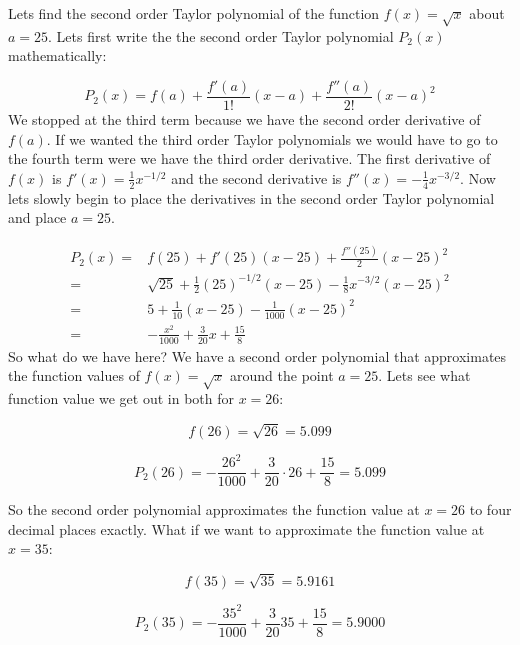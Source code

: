 \documentclass[main.tex]{subfiles}
\begin{document}
\begin{example}
Lets find the second order Taylor polynomial of the function $f(x) = \sqrt{x}$ about $a=25$. Lets first write the the second order Taylor polynomial $P_2(x)$ mathematically:

\begin{equation}
P_2(x) = f(a) + \frac{f'(a)}{1!}(x-a) + \frac{f''(a)}{2!}(x-a)^2
\end{equation}
We stopped at the third term because we have the second order derivative of $f(a)$. If we wanted the third order Taylor polynomials we would have to go to the fourth term were we have the third order derivative. The first derivative of $f(x)$ is $f'(x)=\frac{1}{2}x^{-1/2}$ and the second derivative is $f''(x) = -\frac{1}{4}x^{-3/2}$. Now lets slowly begin to place the derivatives in the second order Taylor polynomial and place $a=25$.

\begin{align}
P_2(x) =& f(25) +f'(25)(x-25) + \frac{f''(25)}{2}(x-25)^2\\
=& \sqrt{25} + \frac{1}{2}(25)^{-1/2}(x-25) -\frac{1}{8}x^{-3/2}(x-25)^2 \\
=& 5 + \frac{1}{10}(x-25) - \frac{1}{1000}(x-25)^2 \\
=& -\frac{x^2}{1000} + \frac{3}{20}x + \frac{15}{8}
\end{align}  
So what do we have here? We have a second order polynomial that approximates the function values of $f(x)=\sqrt{x}$ around the point $a=25$. Lets see what function value we get out in both for $x = 26$:

\begin{equation}
f(26) = \sqrt{26} = 5.099
\end{equation}

\begin{equation}
P_2(26) = -\frac{26^2}{1000} + \frac{3}{20} \cdot 26 + \frac{15}{8} = 5.099
\end{equation}

So the second order polynomial approximates the function value at $x = 26$ to four decimal places exactly. What if we want to approximate the function value at $x=35$:

\begin{equation}
f(35) = \sqrt{35} = 5.9161
\end{equation}

\begin{equation}
P_2(35) = -\frac{35^2}{1000} + \frac{3}{20}35 + \frac{15}{8} = 5.9000
\end{equation}


\end{example}
\end{document}
